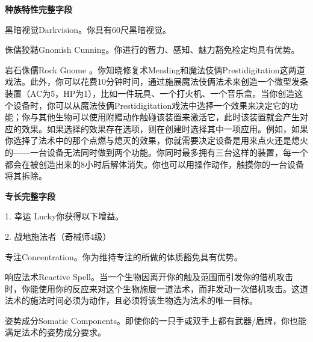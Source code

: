 \documentclass[letterpaper,openany,twoside,twocolumn]{book}
\begin{document}
\par\noindent\textbf{种族特性完整字段}\par
黑暗视觉Darkvision。你具有60尺黑暗视觉。\par
侏儒狡黠Gnomish Cunning。你进行的智力、感知、魅力豁免检定均具有优势。\par
岩石侏儒Rock Gnome 。你知晓修复术Mending和魔法伎俩Prestidigitation这两道戏法。此外，你可以花费10分钟时间，通过施展魔法伎俩法术来创造一个微型发条装置（AC为5，HP为1），比如一件玩具、一个打火机、一个音乐盒。当你创造这个设备时，你可以从魔法伎俩Prestidigitation戏法中选择一个效果来决定它的功能；你与其他生物可以使用附赠动作触碰该装置来激活它，此时该装置就会产生对应的效果。如果选择的效果存在选项，则在创建时选择其中一项应用。例如，如果你选择了法术中的那个点燃与熄灭的效果，你就需要决定设备是用来点火还是熄火的——一台设备无法同时做到两个功能。你同时最多拥有三台这样的装置，每一个都会在被创造出来的8小时后解体消失。你也可以用操作动作，触摸你的一台设备将其拆除。\par


\par\noindent\textbf{专长完整字段}\par
1. 幸运 Lucky你获得以下增益。\par
2. 战地施法者（奇械师4级）\par
专注Concentration。你为维持专注的所做的体质豁免具有优势。\par
响应法术Reactive Spell。当一个生物因离开你的触及范围而引发你的借机攻击时，你能使用你的反应来对这个生物施展一道法术，而非发动一次借机攻击。这道法术的施法时间必须为动作，且必须将该生物选为法术的唯一目标。\par
姿势成分Somatic Components。即使你的一只手或双手上都有武器/盾牌，你也能满足法术的姿势成分要求。\par
\end{document}
